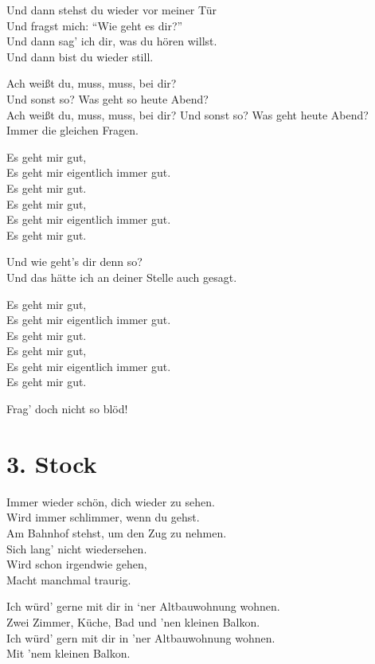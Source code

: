 \documentclass[]{book}
\begin{document}
Und dann stehst du wieder vor meiner Tür\\
Und fragst mich: ``Wie geht es dir?''\\
Und dann sag' ich dir, was du hören willst.\\
Und dann bist du wieder still.

Ach weißt du, muss, muss, bei dir?\\
Und sonst so? Was geht so heute Abend?\\
Ach weißt du, muss, muss, bei dir? Und sonst so? Was geht heute Abend?\\
Immer die gleichen Fragen.

Es geht mir gut,\\
Es geht mir eigentlich immer gut.\\
Es geht mir gut.\\
Es geht mir gut,\\
Es geht mir eigentlich immer gut.\\
Es geht mir gut.

Und wie geht's dir denn so?\\
Und das hätte ich an deiner Stelle auch gesagt.

Es geht mir gut,\\
Es geht mir eigentlich immer gut.\\
Es geht mir gut.\\
Es geht mir gut,\\
Es geht mir eigentlich immer gut.\\
Es geht mir gut.

Frag' doch nicht so blöd!

\hypertarget{stock}{%
\section{3. Stock}\label{stock}}

Immer wieder schön, dich wieder zu sehen.\\
Wird immer schlimmer, wenn du gehst.\\
Am Bahnhof stehst, um den Zug zu nehmen.\\
Sich lang' nicht wiedersehen.\\
Wird schon irgendwie gehen,\\
Macht manchmal traurig.

Ich würd' gerne mit dir in `ner Altbauwohnung wohnen.\\
Zwei Zimmer, Küche, Bad und 'nen kleinen Balkon.\\
Ich würd' gern mit dir in 'ner Altbauwohnung wohnen.\\
Mit 'nem kleinen Balkon.
\end{document}
